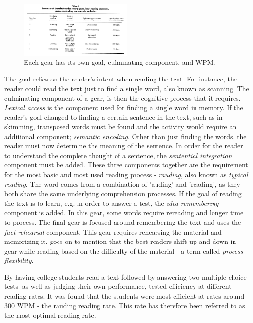 \begin{figure}[htbp]
\centering
\includegraphics[width=0.5\textwidth]{Pics/gears_list}
\caption{Each gear has its own goal, culminating component, and WPM.}
\label{fig:gears_list}
\end{figure}

The goal relies on the reader's intent when reading the text. For instance, the reader could read the text just to find a single word, also known as scanning. The culminating component of a gear, is then the cognitive process that it requires. \textit{Lexical access} is the component used for finding a single word in memory. If the reader's goal changed to finding a certain sentence in the text, such as in skimming, transposed words must be found and the activity would require an additional component; \textit{semantic encoding}. Other than just finding the words, the reader must now determine the meaning of the sentence. In order for the reader to understand the complete thought of a sentence, the \textit{sentential integration} component must be added. These three components together are the requirement for the most basic and most used reading process - \textit{rauding}, also known as \textit{typical reading}. The word comes from a combination of 'auding' and 'reading', as they both share the same underlying comprehension processes. If the goal of reading the text is to learn, e.g. in order to answer a test, the \textit{idea remembering} component is added. In this gear, some words require rereading and longer time to process. The final gear is focused around remembering the text and uses the \textit{fact rehearsal} component. This gear requires rehearsing the material and memorizing it. 
\cite{carver_reading_1992} goes on to mention that the best readers shift up and down in gear while reading based on the difficulty of the material - a term called \textit{process flexibility}. 

By having college students read a text followed by answering two multiple choice tests, as well as judging their own performance, \cite{carver_reading_1992} tested efficiency at different reading rates. It was found that the students were most efficient at rates around 300 WPM - the rauding reading rate. This rate has therefore been referred to as the most optimal reading rate.


